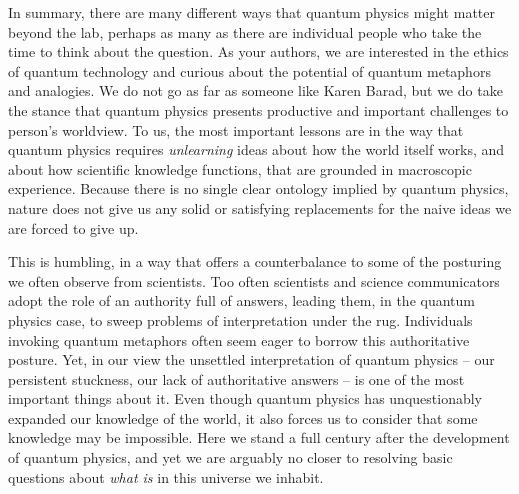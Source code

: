 \documentclass[onecolumn,preprintnumbers,amsmath,amssymbn,reprint,nofootinbib,superscriptaddress]{revtex4}    %
\begin{document}
In summary, there are many different ways that quantum physics might matter beyond the lab, perhaps as many as there are individual people who take the time to think about the question.  As your authors, we are interested in the ethics of quantum technology and curious about the potential of quantum metaphors and analogies.  We do not go as far as someone like Karen Barad, but we do take the stance that quantum physics presents productive and important challenges to person's worldview.  To us, the most important lessons are in the way that quantum physics requires {\em unlearning} ideas about how the world itself works, and about how scientific knowledge functions, that are grounded in macroscopic experience.  Because there is no single clear ontology implied by quantum physics, nature does not give us any solid or satisfying replacements for the naive ideas we are forced to give up.  

This is humbling, in a way that offers a counterbalance to some of the posturing we often observe from scientists.  Too often scientists and science communicators adopt the role of an authority full of answers, leading them, in the quantum physics case, to sweep problems of interpretation under the rug.  Individuals invoking quantum metaphors often seem eager to borrow this authoritative posture.  Yet, in our view the unsettled interpretation of quantum physics -- our persistent stuckness, our lack of authoritative answers -- is one of the most important things about it.  Even though quantum physics has unquestionably expanded our knowledge of the world, it also forces us to consider that some knowledge may be impossible.  Here we stand a full century after the development of quantum physics, and yet we are arguably no closer to resolving basic questions about {\em what is} in this universe we inhabit.     


\end{document}
